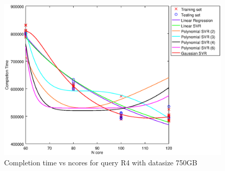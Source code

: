 
\begin {figure}[hbtp]
\centering
\includegraphics[width=\textwidth]{output/R4_750_ONLY_1_OVER_NCORES/plot_R4_750.eps}
\caption{Completion time vs ncores for query R4 with datasize 750GB}
\label{fig:all_nonlinear_R4_750}
\end {figure}
